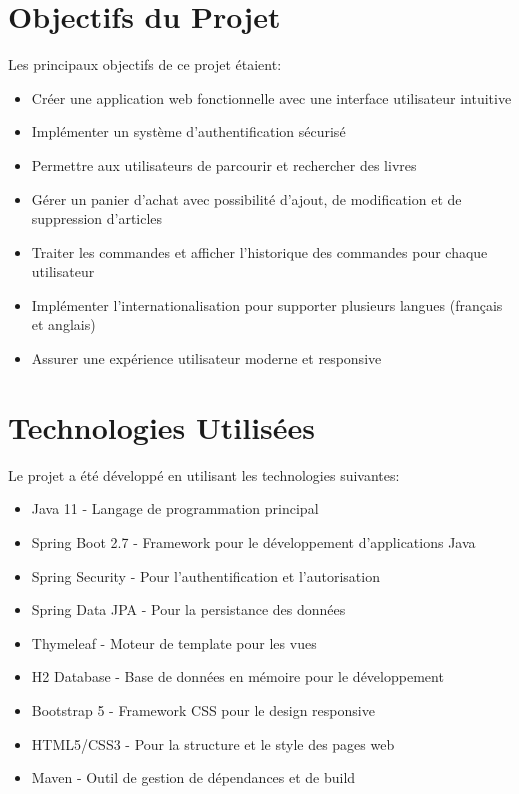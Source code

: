 \documentclass[12pt,a4paper]{report}
\begin{document}
\section{Objectifs du Projet}
Les principaux objectifs de ce projet étaient:
\begin{itemize}
    \item Créer une application web fonctionnelle avec une interface utilisateur intuitive
    \item Implémenter un système d'authentification sécurisé
    \item Permettre aux utilisateurs de parcourir et rechercher des livres
    \item Gérer un panier d'achat avec possibilité d'ajout, de modification et de suppression d'articles
    \item Traiter les commandes et afficher l'historique des commandes pour chaque utilisateur
    \item Implémenter l'internationalisation pour supporter plusieurs langues (français et anglais)
    \item Assurer une expérience utilisateur moderne et responsive
\end{itemize}

\section{Technologies Utilisées}
Le projet a été développé en utilisant les technologies suivantes:
\begin{itemize}
    \item Java 11 - Langage de programmation principal
    \item Spring Boot 2.7 - Framework pour le développement d'applications Java
    \item Spring Security - Pour l'authentification et l'autorisation
    \item Spring Data JPA - Pour la persistance des données
    \item Thymeleaf - Moteur de template pour les vues
    \item H2 Database - Base de données en mémoire pour le développement
    \item Bootstrap 5 - Framework CSS pour le design responsive
    \item HTML5/CSS3 - Pour la structure et le style des pages web
    \item Maven - Outil de gestion de dépendances et de build
\end{itemize}
\end{document}
